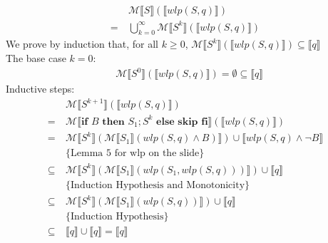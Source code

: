 \documentclass[11pt]{article}
\begin{document}
\begin{enumerate}
\begin{enumerate}
\begin{itemize}
\begin{align*}
						&\mathcal{M}\llbracket S\rrbracket(\llbracket wlp(S, q)\rrbracket)\\
						=~ & \bigcup_{k=0}^{\infty}\mathcal{M}\llbracket S^{k} \rrbracket (\llbracket wlp(S,q) \rrbracket)
					\end{align*}
						We prove by induction that, for all $k \geq 0$, $\mathcal{M}\llbracket S^{k} \rrbracket (\llbracket wlp(S,q) \rrbracket) \subseteq \llbracket q \rrbracket$\\
						The base case $k=0$:
					\begin{align*}
						&\mathcal{M}\llbracket S^{0}\rrbracket(\llbracket wlp(S,q) \rrbracket) = \emptyset \subseteq \llbracket q \rrbracket
					\end{align*}
						Inductive steps:
					\begin{align*}
						&\mathcal{M}\llbracket S^{k+1}\rrbracket(\llbracket wlp(S,q) \rrbracket)\\
						=~ & \mathcal{M}\llbracket \textbf{if } B \textbf{ then } S_{1}; S^{k} \textbf{ else skip fi}\rrbracket(\llbracket wlp(S,q) \rrbracket)\\
						=~ & \mathcal{M}\llbracket S^{k} \rrbracket (\mathcal{M}\llbracket S_{1} \rrbracket (wlp(S, q) \land B) \rrbracket) \cup \llbracket wlp(S,q) \land \neg B \rrbracket\\
						&\{\text{Lemma 5 for wlp on the slide}\}\\
						\subseteq~ & \mathcal{M}\llbracket S^{k} \rrbracket (\mathcal{M}\llbracket S_{1} \rrbracket (wlp(S_{1}, wlp(S, q))) \rrbracket) \cup \llbracket q \rrbracket\\
						&\{\text{Induction Hypothesis and Monotonicity}\}\\
						\subseteq~ & \mathcal{M}\llbracket S^{k} \rrbracket (\mathcal{M}\llbracket S_{1} \rrbracket (wlp(S, q)) \rrbracket) \cup \llbracket q \rrbracket\\
						&\{\text{Induction Hypothesis}\}\\
						\subseteq~ & \llbracket q \rrbracket \cup \llbracket q \rrbracket = \llbracket q \rrbracket
					\end{align*}
			\end{itemize}
		\end{enumerate}


\end{enumerate}
\end{document}
